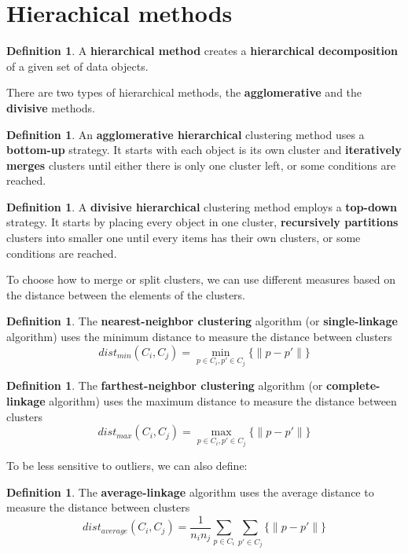 \documentclass[12pt, openany]{report}
\theoremstyle{definition}
\newtheorem{definition}[thm]{Definition}
\begin{document}
\section{Hierachical methods}
\begin{definition}
    A \textbf{hierarchical method} creates a \textbf{hierarchical decomposition} of a given set of data objects.
\end{definition}
There are two types of hierarchical methods, the \textbf{agglomerative} and the \textbf{divisive} methods. 
\begin{definition}
    An \textbf{agglomerative hierarchical} clustering method uses a \textbf{bottom-up} strategy. It starts with each object is its own cluster and \textbf{iteratively merges} clusters until either there is only one cluster left, or some conditions are reached.
\end{definition}
\begin{definition}
    A \textbf{divisive hierarchical} clustering method employs a \textbf{top-down} strategy. It starts by placing every object in one cluster, \textbf{recursively partitions} clusters into smaller one until every items has their own clusters, or some conditions are reached.
\end{definition}
To choose how to merge or split clusters, we can use different measures based on the distance between the elements of the clusters.
\begin{definition}
    The \textbf{nearest-neighbor clustering} algorithm (or \textbf{single-linkage} algorithm) uses the minimum distance to measure the distance between clusters
    \begin{equation}
        dist_{min}(C_i, C_j) = \min_{p \in C_i, p' \in C_j} \{\|p - p'\|\}
    \end{equation}
\end{definition}
\begin{definition}
    The \textbf{farthest-neighbor clustering} algorithm (or \textbf{complete-linkage} algorithm) uses the maximum distance to measure the distance between clusters
    \begin{equation}
        dist_{max}(C_i, C_j) = \max_{p \in C_i, p' \in C_j} \{\|p - p'\|\}
    \end{equation}
\end{definition}
To be less sensitive to outliers, we can also define:
\begin{definition}
    The \textbf{average-linkage} algorithm uses the average distance to measure the distance between clusters
    \begin{equation}
        dist_{average}(C_i, C_j) = \frac{1}{n_i n_j} \sum_{p \in C_i} \sum_{p' \in C_j} \{\|p - p'\|\}
    \end{equation}
\end{definition}
\end{document}
